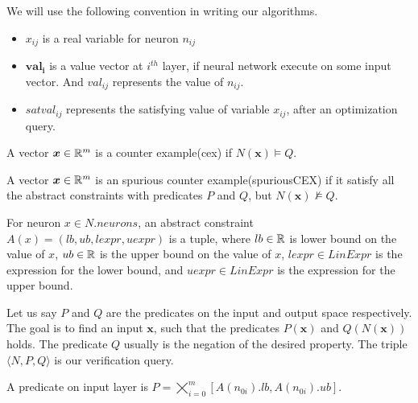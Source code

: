 

We will use the following convention in writing our algorithms.
\begin{itemize}
\item $x_{ij}$ is a real variable for neuron $n_{ij}$
\item $\boldsymbol{val_{i}}$ is a value vector at $i^{th}$ layer, if neural network execute on some input vector. And $val_{ij}$ represents the value of $n_{ij}$. 
\item $satval_{ij}$ represents the satisfying value of variable $x_{ij}$, after an optimization query.
\end{itemize}


\begin{df}
  A vector $\boldsymbol{x} \in \mathbb{R}^m$ is a counter example(cex) if $N(\boldsymbol{x}) \models Q$.  
\end{df}

\begin{df}
  A vector $\boldsymbol{x} \in \mathbb{R}^m$ is an spurious counter example(spuriousCEX) if it satisfy all the abstract constraints
  with predicates $P$ and $Q$, but $N(\boldsymbol{x}) \nvDash Q$. 
\end{df}


\begin{df}
  For neuron $x \in N.neurons$,
  an abstract constraint $A(x) = (lb,ub, lexpr, uexpr)$ is a tuple, where
  $lb \in \mathbb{R}$ is lower bound on the value of $x$,
  $ub \in \mathbb{R}$ is the upper bound on the value of  $x$,
  $lexpr \in LinExpr$ is the expression for the lower bound, and
  $uexpr \in LinExpr$ is the expression for the upper bound.
\end{df}

Let us say $P$ and $Q$ are the predicates on the input and output space respectively. 
The goal is to find an input $\boldsymbol{x}$, such that the predicates $P(\boldsymbol{x})$ and 
$Q(N(\boldsymbol{x}))$ holds. The predicate $Q$ usually is the negation of the desired property. 
The triple $\langle N, P, Q \rangle$ is our verification query. 

\begin{df}
  A predicate on input layer is $P = \bigtimes_{i=0}^{m}[A(n_{0i}).lb, A(n_{0i}).ub]$. 
\end{df}


